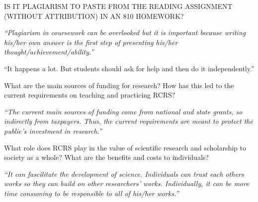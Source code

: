 \documentclass[portrait,11pt]{seminar}
\begin{document}
\medskip

IS IT PLAGIARISM TO PASTE FROM THE READING ASSIGNMENT (WITHOUT ATTRIBUTION) IN AN 810 HOMEWORK?

\es

\bs
\it ``Plagiarism in coursework can be overlooked but it is important because writing
his/her own answer is the first step of presenting his/her thought/achievement/ability.''


\medskip

\medskip

``It happens a lot. But students should ask for help and then do it independently.''
\es

\bs

  What are the main sources of funding for research? How has this led to the current requirements on teaching and practicing RCRS?




\it ``The current main sources of funding come from national and state grants, so indirectly from taxpayers. Thus, the current requirements are meant to protect the public's investment in research.''



\es

\bs

  What role does RCRS play in the value of scientific research and scholarship to society as a whole? What are the benefits and costs to individuals?





\it ``It can fascilitate the development of science. Individuals can trust each others works so
they can build on other researchers’ works. Individually, it can be more time consuming
to be responsible to all of his/her works.''
\end{document}
